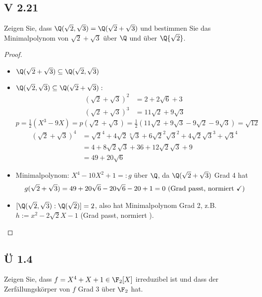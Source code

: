 \subsection{V 2.21}
Zeigen Sie, dass $\Q(\sqrt{2}, \sqrt{3}) = \Q(\sqrt{2}+\sqrt{3})$ und bestimmen Sie das Minimalpolynom von $\sqrt{2} + \sqrt{3}$ über $\Q$ und über $\Q{\sqrt{2}}$.

\begin{proof}
	\begin{itemize}
		\item $\Q(\sqrt{2}+\sqrt{3}) \subseteq \Q(\sqrt{2},\sqrt{3})$
		\item $\Q(\sqrt{2}, \sqrt{3}) \subseteq \Q(\sqrt{2} + \sqrt{3}):$
		\begin{align*}
			(\sqrt{2}+\sqrt{3})^2 &= 2 + 2\sqrt{6} +3\\
			(\sqrt{2} + \sqrt{3})^3 &= 11\sqrt{2} + 9 \sqrt{3}
		\end{align*}
		$p = \frac{1}{2}(X^3 - 9X) = p(\sqrt{2}+\sqrt{3}) = \frac{1}{2}(11\sqrt{2} + 9\sqrt{3}-9\sqrt{2}-9\sqrt{3}) = \sqrt{12}$
		\begin{align*}
			(\sqrt{2}+\sqrt{3})^4 &= \sqrt{2}^4 + 4\sqrt{2}\sqrt[3]{3} + 6\sqrt{2}^2\sqrt{3}^2 + 4\sqrt{2}\sqrt{3}^3 + \sqrt{3}^4\\
			&= 4 + 8 \sqrt{2}\sqrt{3} + 36 + 12\sqrt{2}\sqrt{3}+9\\
			&=49 + 20\sqrt{6}
		\end{align*}
		\item Minimalpolynom: $X^4 -10 X^2 + 1 =: g$ über $\Q$, da $\Q(\sqrt{2}+\sqrt{3})$ Grad 4 hat
		\begin{align*}
			g(\sqrt{2}+\sqrt{3}) = 49 + 20\sqrt{6}-20 \sqrt{6} - 20 +1 =0 \text{ (Grad passt, normiert \checkmark)}
		\end{align*}
		\item $[\Q(\sqrt{2},\sqrt{3}):\Q(\sqrt{2})] = 2$, also hat Minimalpolynom Grad 2, z.B. $h:= x^2 - 2\sqrt{2}X-1$ (Grad passt, normiert \checkmark).
	\end{itemize}
\end{proof}

\subsection{Ü 1.4}
Zeigen Sie, dass $f = X^4 + X +1 \in \F_2 [X]$ irreduzibel ist und dass der Zerfällungskörper von $f$ Grad 3 über $\F_2$ hat.

